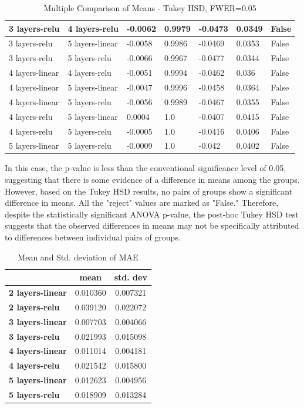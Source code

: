 \documentclass[manuscript,screen,review]{acmart}
\begin{document}
\begin{table}[h]
\begin{tabular}{|l|l|l|l|l|l|l|}
  3 layers-relu &  4 layers-relu & -0.0062 &0.9979 &-0.0473 &0.0349 & False \\ \hline
  3 layers-relu &5 layers-linear & -0.0058 &0.9986 &-0.0469 &0.0353 & False \\ \hline
  3 layers-relu &  5 layers-relu & -0.0066 &0.9967 &-0.0477 &0.0344 & False \\ \hline
4 layers-linear &  4 layers-relu & -0.0051 &0.9994 &-0.0462 & 0.036 & False \\ \hline
4 layers-linear &5 layers-linear & -0.0047 &0.9996 &-0.0458 &0.0364 & False \\ \hline
4 layers-linear &  5 layers-relu & -0.0056 &0.9989 &-0.0467 &0.0355 & False \\ \hline
  4 layers-relu &5 layers-linear &  0.0004 &   1.0 &-0.0407 &0.0415 & False \\ \hline
  4 layers-relu &  5 layers-relu & -0.0005 &   1.0 &-0.0416 &0.0406 & False \\ \hline
5 layers-linear &  5 layers-relu & -0.0009 &   1.0 & -0.042 &0.0402 & False \\ \hline
\end{tabular}
\caption{Multiple Comparison of Means - Tukey HSD, FWER=0.05}
\label{tab:Tukey_HSD}
\end{table}

In this case, the p-value is less than the conventional significance level of 0.05, suggesting that there is some evidence of a difference in means among the groups.
However, based on the Tukey HSD results, no pairs of groups show a significant difference in means. All the "reject" values are marked as "False." Therefore, despite the statistically significant ANOVA p-value, the post-hoc Tukey HSD test suggests that the observed differences in means may not be specifically attributed to differences between individual pairs of groups.

\begin{table}[h]
    \begin{tabular}{|l|*{2}{c|}}
    \hline
    &   \textbf{mean} &   \textbf{std. dev}\\ \hline
\textbf{2 layers-linear} & 0.010360 & 0.007321 \\ \hline
\textbf{2 layers-relu} & 0.039120 & 0.022072 \\ \hline
\cellcolor{red} \textbf{3 layers-linear} & 0.007703 & 0.004066 \\ \hline
\textbf{3 layers-relu} & 0.021993 & 0.015098 \\ \hline
\textbf{4 layers-linear} & 0.011014 & 0.004181 \\ \hline
\textbf{4 layers-relu} & 0.021542 & 0.015800 \\ \hline
\textbf{5 layers-linear} & 0.012623 & 0.004956 \\ \hline
\textbf{5 layers-relu} & 0.018909 & 0.013284 \\ \hline       
\end{tabular}
\caption{Mean and Std. deviation of MAE}
\label{tab:mean_std}
\end{table}
\end{document}
